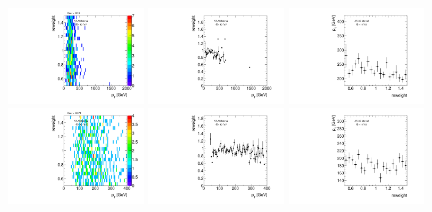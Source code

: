 \begin{figure}[htbp!]
\begin{center}
\includegraphics[angle=270, width=0.32\textwidth]{./figures/boosted/AppendixReweight/Weights/4Trk_Signal_leadHCand_trk0_Pt_weight.pdf}
\includegraphics[angle=270, width=0.32\textwidth]{./figures/boosted/AppendixReweight/Weights/4Trk_Signal_leadHCand_trk0_Pt_weight_profx.pdf}
\includegraphics[angle=270, width=0.32\textwidth]{./figures/boosted/AppendixReweight/Weights/4Trk_Signal_leadHCand_trk0_Pt_weight_profy.pdf}\\
\includegraphics[angle=270, width=0.32\textwidth]{./figures/boosted/AppendixReweight/Weights/4Trk_Signal_sublHCand_trk0_Pt_weight.pdf}
\includegraphics[angle=270, width=0.32\textwidth]{./figures/boosted/AppendixReweight/Weights/4Trk_Signal_sublHCand_trk0_Pt_weight_profx.pdf}
\includegraphics[angle=270, width=0.32\textwidth]{./figures/boosted/AppendixReweight/Weights/4Trk_Signal_sublHCand_trk0_Pt_weight_profy.pdf}\\

\end{center}
\end{figure}

